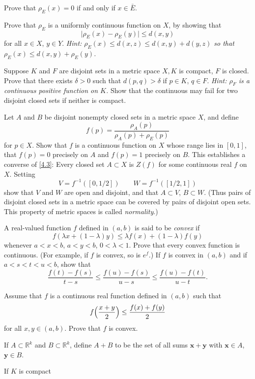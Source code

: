 \begin{exercise}
\begin{exercise}[label = (\alph*)]
  \item
    Prove that \(\rho_E(x) = 0\) if and only if \(x\in\bar{E}\).
  \item
    Prove that \(\rho_E\) is a uniformly continuous function on \(X\), by
    showing that
    \[
    \lvert\rho_E(x) - \rho_E(y)\rvert\leq d(x, y)
    \]
    for all \(x\in X\), \(y\in Y\).
    \textit{Hint: \(\rho_E(x)\leq d(x,z)\leq d(x,y) + d(y,z)\) so that
      \(\rho_E(x)\leq d(x,y) + \rho_E(y)\).}
  \end{exercise}
\item
  Suppose \(K\) and \(F\) are disjoint sets in a metric space \(X,K\) is
  compact, \(F\) is closed.
  Prove that there exists \(\delta > 0\) such that \(d(p,q) > \delta\) if
  \(p\in K\), \(q\in F\).
  \textit{Hint: \(\rho_F\) is a continuous positive function on \(K\).}
  Show that the continuous may fail for two disjoint closed sets if neither is
  compact.
\item
  Let \(A\) and \(B\) be disjoint nonempty closed sets in a metric space \(X\),
  and define
  \[
  f(p) = \frac{\rho_A(p)}{\rho_A(p) + \rho_E(p)}
  \]
  for \(p\in X\).
  Show that \(f\) is a continuous function on \(X\) whose range lies in
  \([0,1]\), that \(f(p) = 0\)  precisely on \(A\) and \(f(p) = 1\) precisely
  on \(B\).
  This establishes a converse of \cref{4.3}: Every closed set \(A\subset X\) is
  \(Z(f)\) for some continuous real \(f\) on \(X\).
  Setting
  \[
  V = f^{-1}([0, 1/2])\qquad W = f^{-1}([1/2, 1])
  \]
  show that \(V\) and \(W\) are open and disjoint, and that \(A\subset V\),
  \(B\subset W\).
  (Thus pairs of disjoint closed sets in a metric space can be covered by pairs
  of disjoint open sets.
  This property of metric spaces is called \textit{normality}.)
\item
  A real-valued function \(f\) defined in \((a,b)\) is said to be
  \textit{convex} if
  \[
  f(\lambda x + (1 - \lambda)y)\leq\lambda f(x) + (1 - \lambda)f(y)
  \]
  whenever \(a < x < b\), \(a < y < b\), \(0 < \lambda < 1\).
  Prove that every convex function is continuous.
  (For example, if \(f\) is convex, so is \(e^f\).)
  If \(f\) is convex in \((a,b)\) and if \(a < s < t < u < b\), show that
  \[
  \frac{f(t) - f(s)}{t - s}\leq\frac{f(u) - f(s)}{u - s}\leq
  \frac{f(u) - f(t)}{u - t}.
  \]
\item
  Assume that \(f\) is a continuous real function defined in \((a,b)\) such
  that
  \[
  f\Bigl(\frac{x + y}{2}\Bigr)\leq \frac{f(x) + f(y)}{2}
  \]
  for all \(x,y\in (a,b)\).
  Prove that \(f\) is convex.
\item
  If \(A\subset\mathbb{R}^k\) and \(B\subset\mathbb{R}^k\), define \(A + B\) to
  be the set of all sums \(\mathbold{x + y}\) with \(\mathbold{x}\in A\),
  \(\mathbold{y}\in B\).
  \begin{exercise}[label = (\alph*)]
  \item
    If \(K\) is compact
  \end{exercise}
\end{exercise}

